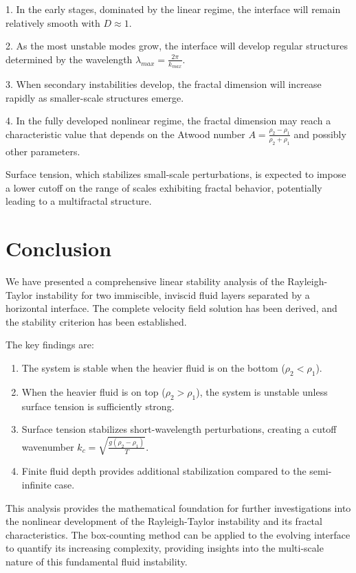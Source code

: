 \documentclass[12pt,a4paper]{article}
\begin{document}
1. In the early stages, dominated by the linear regime, the interface will remain relatively smooth with $D \approx 1$.

2. As the most unstable modes grow, the interface will develop regular structures determined by the wavelength $\lambda_{max} = \frac{2\pi}{k_{max}}$.

3. When secondary instabilities develop, the fractal dimension will increase rapidly as smaller-scale structures emerge.

4. In the fully developed nonlinear regime, the fractal dimension may reach a characteristic value that depends on the Atwood number $A = \frac{\rho_2 - \rho_1}{\rho_2 + \rho_1}$ and possibly other parameters.

Surface tension, which stabilizes small-scale perturbations, is expected to impose a lower cutoff on the range of scales exhibiting fractal behavior, potentially leading to a multifractal structure.

\section{Conclusion}
We have presented a comprehensive linear stability analysis of the Rayleigh-Taylor instability for two immiscible, inviscid fluid layers separated by a horizontal interface. The complete velocity field solution has been derived, and the stability criterion has been established.

The key findings are:
\begin{enumerate}
    \item The system is stable when the heavier fluid is on the bottom ($\rho_2 < \rho_1$).
    \item When the heavier fluid is on top ($\rho_2 > \rho_1$), the system is unstable unless surface tension is sufficiently strong.
    \item Surface tension stabilizes short-wavelength perturbations, creating a cutoff wavenumber $k_c = \sqrt{\frac{g(\rho_2 - \rho_1)}{T}}$.
    \item Finite fluid depth provides additional stabilization compared to the semi-infinite case.
\end{enumerate}

This analysis provides the mathematical foundation for further investigations into the nonlinear development of the Rayleigh-Taylor instability and its fractal characteristics. The box-counting method can be applied to the evolving interface to quantify its increasing complexity, providing insights into the multi-scale nature of this fundamental fluid instability.
\end{document}
